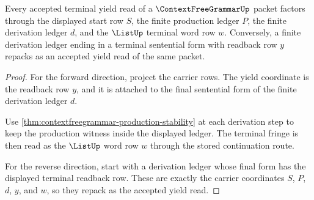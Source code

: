 \begin{theorem}
\label{thm:contextfreegrammar-yield-readback}
Every accepted terminal yield read of a $\ContextFreeGrammarUp$ packet factors
through the displayed start row $S$, the finite production ledger $P$, the
finite derivation ledger $d$, and the $\ListUp$ terminal word row $w$.
Conversely, a finite derivation ledger ending in a terminal sentential form
with readback row $y$ repacks as an accepted yield read of the same packet.
\end{theorem}
\begin{proof}
For the forward direction, project the carrier rows. The yield coordinate is
the readback row $y$, and it is attached to the final sentential form of the
finite derivation ledger $d$.

Use \autoref{thm:contextfreegrammar-production-stability} at each derivation
step to keep the production witness inside the displayed ledger. The terminal
fringe is then read as the $\ListUp$ word row $w$ through the stored
continuation route.

For the reverse direction, start with a derivation ledger whose final form has
the displayed terminal readback row. These are exactly the carrier coordinates
$S$, $P$, $d$, $y$, and $w$, so they repack as the accepted yield read.
\end{proof}

